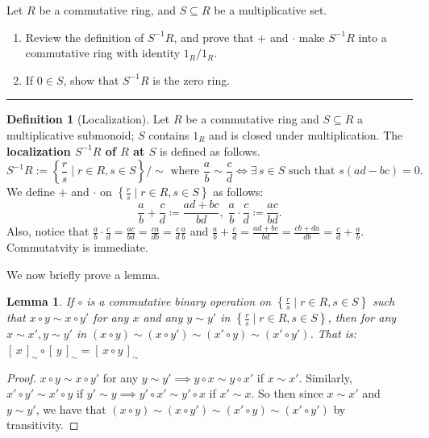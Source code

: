 \documentclass[addpoints,10pt]{exam}
\theoremstyle{plain}
\theoremstyle{definition}
\newtheorem{prob}[thm]{Problem}
\theoremstyle{plain}
\theoremstyle{plain}
\newtheorem{lem}[thm]{Lemma}
\theoremstyle{definition}
\newtheorem{definition}[thm]{Definition}
\let\oldprob\prob
\let\endoldprob\endprob
\renewenvironment{prob}
  {\begin{singlespace}\oldprob}
  {\endoldprob\end{singlespace}}
\newcommand{\class}[2][]{\ensuremath{\left[\,#2\,\right]_{#1}}}
\begin{document}
\newpage
\begin{prob}
Let $R$ be a commutative ring, and $S \subseteq R$ be a multiplicative set.
\begin{enumerate}[label=(\alph*)]
\item Review the definition of $S^{-1}R$, and prove that $+$ and $\cdot$ make $S^{-1}R$ into a commutative ring with identity $1_R/1_R$.
\item If $0 \in S$, show that $S^{-1}R$ is the zero ring.
\end{enumerate}
\end{prob}
\hrule
\setcounter{thm}{0} %
    \begin{definition}[Localization]
    Let $R$ be a commutative ring and $S \subseteq R$ a multiplicative submonoid; $S$ contains $1_{R}$ and is closed under multiplication. The \textbf{localization $S^{-1}R$ of $R$ at $S$} is defined as follows.
        $$S^{-1}R := \left\{\frac{r}{s} \mid r \in R, s \in S\right\}/\sim \text{ where }\frac{a}{b}\sim \frac{c}{d} \iff \exists\, s \in S \text{ such that } s(ad-bc)=0.$$ 
    We define $+$ and $\cdot$ on $\left\{\frac{r}{s} \mid r \in R, s \in S\right\}$ as follows:
    $$
    \frac{a}{b} + \frac{c}{d} \coloneq \frac{ad+bc}{bd},\;\frac{a}{b} \cdot \frac{c}{d} \coloneq \frac{ac}{bd}.
    $$
    Also, notice that $\frac{a}{b}\cdot\frac{c}{d}=\frac{ac}{bd}=\frac{ca}{db}=\frac{c}{d}\frac{a}{b}$ and $\frac{a}{b}+\frac{c}{d}=\frac{ad+bc}{bd}=\frac{cb+da}{db}=\frac{c}{d}+\frac{a}{b}$. Commutatvity is immediate.
    \end{definition}
We now briefly prove a lemma.
\setcounter{thm}{0} %
    \begin{lem}\label{lem:localwd}
    If $\circ$ is a commutative binary operation on $\left\{\frac{r}{s} \mid r \in R, s \in S\right\}$ such that $x\circ y\sim x\circ y'$ for any $x$ and any $y\sim y'$ in $\left\{\frac{r}{s} \mid r \in R, s \in S\right\}$, then for any $x\sim x',y\sim y'$ in $(x\circ y)\sim (x\circ y')\sim (x'\circ y)\sim (x'\circ y')$. That is: $\class[\sim]{x}\circ \class[\sim]{y}=\class[\sim]{x\circ y}$
    \end{lem}
\begin{proof}
 $x\circ y\sim x\circ y'$ for any $y\sim y'\implies y\circ x\sim y\circ x'$ if $x\sim x'$. Similarly, $x'\circ y'\sim x'\circ y$ if $y'\sim y\implies y'\circ x'\sim y'\circ x$ if $x'\sim x$. So then since $x\sim x'$ and $y\sim y'$, we have that $(x\circ y)\sim (x\circ y')\sim (x'\circ y)\sim (x'\circ y')$ by transitivity. 
\end{proof}
\end{document}
